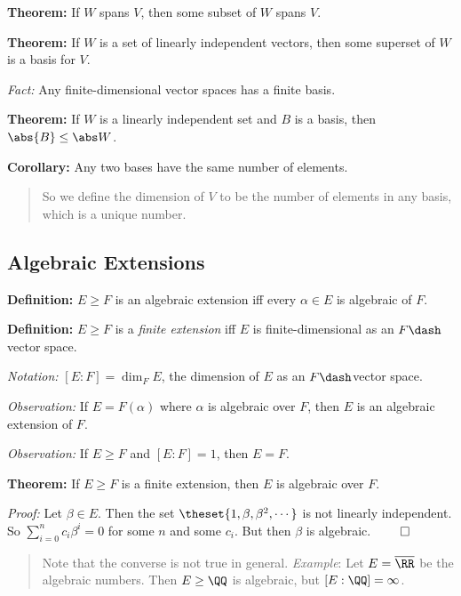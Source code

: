 \textbf{Theorem:} If \(W\) spans \(V\), then some subset of \(W\) spans
\(V\).

\textbf{Theorem:} If \(W\) is a set of linearly independent vectors,
then some superset of \(W\) is a basis for \(V\).

\emph{Fact:} Any finite-dimensional vector spaces has a finite basis.

\textbf{Theorem:} If \(W\) is a linearly independent set and \(B\) is a
basis, then \(\abs{B} \leq \abs W\).

\textbf{Corollary:} Any two bases have the same number of elements.

\begin{quote}
So we define the dimension of \(V\) to be the number of elements in any
basis, which is a unique number.
\end{quote}

\hypertarget{algebraic-extensions}{%
\subsection{Algebraic Extensions}\label{algebraic-extensions}}

\textbf{Definition:} \(E \geq F\) is an algebraic extension iff every
\(\alpha \in E\) is algebraic of \(F\).

\textbf{Definition:} \(E \geq F\) is a \emph{finite extension} iff \(E\)
is finite-dimensional as an \(F\dash\)vector space.

\emph{Notation:} \([E: F] = \dim_F E\), the dimension of \(E\) as an
\(F\dash\)vector space.

\emph{Observation:} If \(E = F(\alpha)\) where \(\alpha\) is algebraic
over \(F\), then \(E\) is an algebraic extension of \(F\).

\emph{Observation:} If \(E\geq F\) and \([E: F] = 1\), then \(E=F\).

\textbf{Theorem:} If \(E \geq F\) is a finite extension, then \(E\) is
algebraic over \(F\).

\emph{Proof:} Let \(\beta \in E\). Then the set
\(\theset{1, \beta, \beta^2, \cdots}\) is not linearly independent. So
\(\sum_{i=0}^n c_i \beta^i = 0\) for some \(n\) and some \(c_i\). But
then \(\beta\) is algebraic. \(\qed\)

\begin{quote}
Note that the converse is not true in general. \emph{Example}: Let
\(E = \overline \RR\) be the algebraic numbers. Then \(E \geq \QQ\) is
algebraic, but \([E : \QQ] = \infty\).
\end{quote}

